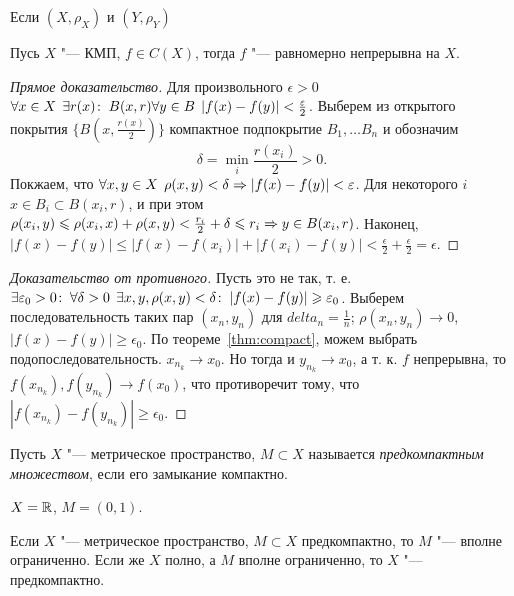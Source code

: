 \documentclass[main]{subfiles}
\begin{document}
\begin{definition}
  Если \( (X, \rho_X) \) и \( (Y, \rho_Y) \)
\end{definition}
\begin{theorem}[Кантор]
  Пусь \( X \) "--- КМП, \( f \in C(X) \),
  тогда \( f \) "--- равномерно непрерывна на \( X \).
\end{theorem}
\begin{proof}[Прямое доказательство]
  Для произвольного \( \epsilon > 0 \)
  \( \forall {x \in X} \; \, \exists r(x) \colon \: B(x, r)
  \forall {y \in B} \; \, |f(x) - f(y)| < \frac{\varepsilon}{2} \).
  Выберем из открытого покрытия
  \( \{ B(x, \frac{r(x)}{2}) \} \) компактное
  подпокрытие \( B_1, \dots B_n \)
  и обозначим \[ \delta = \min_i \frac{r(x_i)}{2} > 0. \]
  Покжаем, что \( \forall {x, y \in X} \; \, \rho(x, y) < \delta
  \Rightarrow |f(x) - f(y)| < \varepsilon \).
  Для некоторого \( i \) \( x \in B_i \subset B(x_i, r) \),
  и при этом \( \rho(x_i, y) \leqslant \rho(x_i, x) + \rho(x, y)
  < \frac{r_i}{2} + \delta \leqslant r_i \Rightarrow y \in B(x_i, r) \).
  Наконец, \( |f(x) - f(y)| \le |f(x) - f(x_i)| + |f(x_i) - f(y)| <
  \frac{\epsilon}{2} + \frac{\epsilon}{2} = \epsilon \).
\end{proof}
\begin{proof}[Доказательство от противного]
  Пусть это не так, т. е.
  \( \exists \varepsilon_0 > 0 \colon \: \forall {\delta > 0} \; \,
  \exists x, y, \rho(x, y) < \delta \colon \: |f(x) - f(y)| \geqslant \varepsilon_0 \).
  Выберем последовательность таких пар \( (x_n, y_n) \)
  для \( delta_n = \frac{1}{n} \); \( \rho(x_n, y_n) \to 0 \),
  \( |f(x) - f(y)| \ge \epsilon_0 \).
  По теореме~\ref{thm:compact}, можем выбрать подопоследовательность.
  \( x_{n_k} \to x_0 \). Но тогда и \( y_{n_k} \to x_0 \),
  а т. к. \( f \) непрерывна, то \( f(x_{n_k}), f(y_{n_k}) \to f(x_0) \),
  что противоречит тому, что \( |f(x_{n_k}) - f(y_{n_k})| \ge \epsilon_0 \).
\end{proof}

\begin{definition}
  Пусть \( X \) "--- метрическое пространство, \( M \subset X \)
  называется \emph{предкомпактным множеством}, если его замыкание компактно.
\end{definition}
\begin{example}
  \( X = \mathbb{R} \), \( M = (0, 1) \).
\end{example}

\begin{exercise}
  Если \( X \) "--- метрическое пространство, \( M \subset X \)
  предкомпактно, то \( M \) "--- вполне ограниченно.
  Если же \( X \) полно, а \( M \) вполне ограниченно,
  то \( X \) "--- предкомпактно.
\end{exercise}
\end{document}
